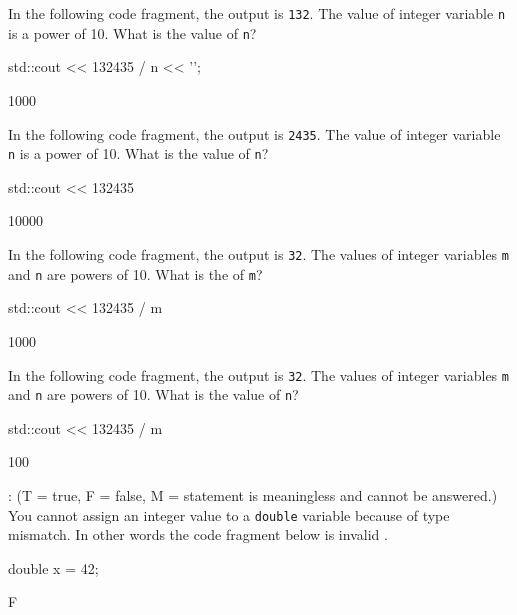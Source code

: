\nextq
In the following code fragment, the output is \verb!132!.
The value of integer variable \verb!n! is a power of 10.
What is the value of \verb!n!?
\begin{console}[fontsize=\footnotesize]
std::cout << 132435 / n << '\n';
\end{console}
\ANSWER
\begin{answercode}
1000
\end{answercode}

\nextq
In the following code fragment, the output is \verb!2435!.
The value of integer variable \verb!n! is a power of 10.
What is the value of \verb!n!?
\begin{console}[fontsize=\footnotesize]
std::cout << 132435 %
\end{console}
\ANSWER
\begin{answercode}
10000
\end{answercode}

\nextq
In the following code fragment, the output is \verb!32!.
The values of integer variables \verb!m! and \verb!n! are powers of 10.
What is the of \verb!m!?
\begin{console}[fontsize=\footnotesize]
std::cout << 132435 / m %
\end{console}
\ANSWER
\begin{answercode}
1000
\end{answercode}

\nextq
In the following code fragment, the output is \verb!32!.
The values of integer variables \verb!m! and \verb!n! are powers of 10.
What is the value of \verb!n!?
\begin{console}[fontsize=\footnotesize]
std::cout << 132435 / m %
\end{console}
\ANSWER
\begin{answercode}
100
\end{answercode}

\nextq
\tf:
(T = true, F = false, M = statement is meaningless and cannot be answered.)
You cannot assign an integer value to a \verb!double! variable because
of type mismatch.
In other words the code fragment below is invalid \cpp.
\begin{console}[fontsize=\footnotesize]
double x = 42;
\end{console}
\ANSWER
\begin{answercode}
F
\end{answercode}

